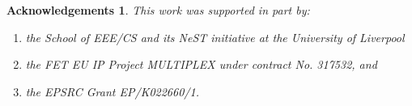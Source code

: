\documentclass[a4paper,UKenglish]{article}
\newtheorem*{acknowledgements*}{Acknowledgements}
\begin{document}
\begin{acknowledgements*}


This work was supported in part by:
\begin{enumerate}[label=(i)]
\item the School of EEE/CS and its NeST initiative at the University of Liverpool
\item the FET EU IP Project MULTIPLEX under contract No. 317532, and
\item the EPSRC Grant EP/K022660/1.
\end{enumerate}
\end{acknowledgements*}




  
\end{document}
